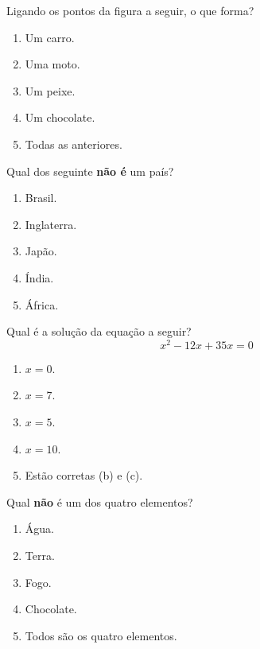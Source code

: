 \documentclass{provaifrs}
\begin{document}
\begin{multicols}{2}
\begin{questoes}
  \item Ligando os pontos da figura a seguir, o que forma?
  \begin{center}
  \end{center}
  \begin{enumerate}
    \item Um carro.
    \item Uma moto.
    \item Um peixe.
    \item Um chocolate.
    \item Todas as anteriores.
  \end{enumerate}

  \item Qual dos seguinte \textbf{não é} um país?
  \begin{enumerate}
    \item Brasil.
    \item Inglaterra.
    \item Japão.
    \item Índia.
    \item África.
  \end{enumerate}

  \item Qual é a solução da equação a seguir?
  \[x^2 - 12x + 35x = 0\]
  \begin{enumerate}
    \item $x = 0$.
    \item $x = 7$.
    \item $x = 5$.
    \item $x = 10$.
    \item Estão corretas (b) e (c).
  \end{enumerate}

  \item Qual \textbf{não} é um dos quatro elementos?
  \begin{enumerate}
    \item Água.
    \item Terra.
    \item Fogo.
    \item Chocolate.
    \item Todos são os quatro elementos.
  \end{enumerate}


\end{questoes}
\end{multicols}
\end{document}
